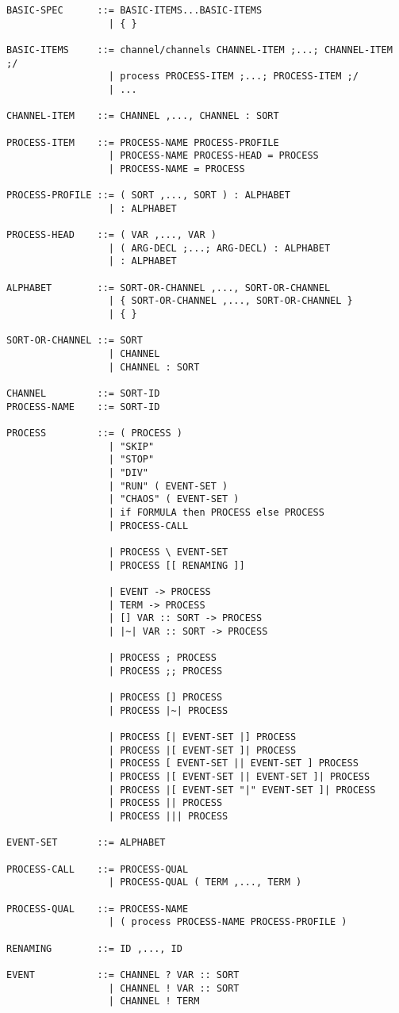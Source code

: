 \begin{verbatim}
BASIC-SPEC      ::= BASIC-ITEMS...BASIC-ITEMS
                  | { }

BASIC-ITEMS     ::= channel/channels CHANNEL-ITEM ;...; CHANNEL-ITEM ;/
                  | process PROCESS-ITEM ;...; PROCESS-ITEM ;/
                  | ...

CHANNEL-ITEM    ::= CHANNEL ,..., CHANNEL : SORT

PROCESS-ITEM    ::= PROCESS-NAME PROCESS-PROFILE
                  | PROCESS-NAME PROCESS-HEAD = PROCESS
                  | PROCESS-NAME = PROCESS

PROCESS-PROFILE ::= ( SORT ,..., SORT ) : ALPHABET
                  | : ALPHABET

PROCESS-HEAD    ::= ( VAR ,..., VAR )
                  | ( ARG-DECL ;...; ARG-DECL) : ALPHABET
                  | : ALPHABET

ALPHABET        ::= SORT-OR-CHANNEL ,..., SORT-OR-CHANNEL
                  | { SORT-OR-CHANNEL ,..., SORT-OR-CHANNEL }
                  | { }

SORT-OR-CHANNEL ::= SORT
                  | CHANNEL
                  | CHANNEL : SORT

CHANNEL         ::= SORT-ID
PROCESS-NAME    ::= SORT-ID

PROCESS         ::= ( PROCESS )
                  | "SKIP"
                  | "STOP"
                  | "DIV"
                  | "RUN" ( EVENT-SET )
                  | "CHAOS" ( EVENT-SET )
                  | if FORMULA then PROCESS else PROCESS
                  | PROCESS-CALL

                  | PROCESS \ EVENT-SET
                  | PROCESS [[ RENAMING ]]

                  | EVENT -> PROCESS
                  | TERM -> PROCESS
                  | [] VAR :: SORT -> PROCESS
                  | |~| VAR :: SORT -> PROCESS

                  | PROCESS ; PROCESS
                  | PROCESS ;; PROCESS

                  | PROCESS [] PROCESS
                  | PROCESS |~| PROCESS

                  | PROCESS [| EVENT-SET |] PROCESS
                  | PROCESS |[ EVENT-SET ]| PROCESS
                  | PROCESS [ EVENT-SET || EVENT-SET ] PROCESS
                  | PROCESS |[ EVENT-SET || EVENT-SET ]| PROCESS
                  | PROCESS |[ EVENT-SET "|" EVENT-SET ]| PROCESS
                  | PROCESS || PROCESS
                  | PROCESS ||| PROCESS

EVENT-SET       ::= ALPHABET

PROCESS-CALL    ::= PROCESS-QUAL
                  | PROCESS-QUAL ( TERM ,..., TERM )

PROCESS-QUAL    ::= PROCESS-NAME
                  | ( process PROCESS-NAME PROCESS-PROFILE )

RENAMING        ::= ID ,..., ID

EVENT           ::= CHANNEL ? VAR :: SORT
                  | CHANNEL ! VAR :: SORT
                  | CHANNEL ! TERM
\end{verbatim}
